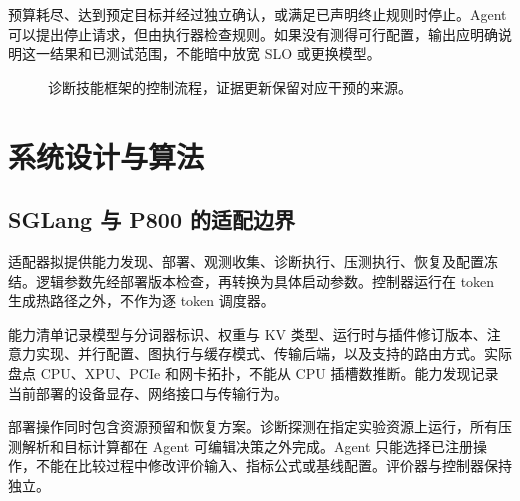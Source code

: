 \documentclass[preprint,12pt]{elsarticle}
\begin{document}
预算耗尽、达到预定目标并经过独立确认，或满足已声明终止规则时停止。Agent 可以提出停止请求，但由执行器检查规则。如果没有测得可行配置，输出应明确说明这一结果和已测试范围，不能暗中放宽 SLO 或更换模型。

\begin{figure}[t]
\centering
{}
\caption{诊断技能框架的控制流程，证据更新保留对应干预的来源。}
\label{fig:architecture}
\end{figure}

\section{系统设计与算法}
\subsection{SGLang 与 P800 的适配边界}
适配器拟提供能力发现、部署、观测收集、诊断执行、压测执行、恢复及配置冻结。逻辑参数先经部署版本检查，再转换为具体启动参数。控制器运行在 token 生成热路径之外，不作为逐 token 调度器。

能力清单记录模型与分词器标识、权重与 KV 类型、运行时与插件修订版本、注意力实现、并行配置、图执行与缓存模式、传输后端，以及支持的路由方式。实际盘点 CPU、XPU、PCIe 和网卡拓扑，不能从 CPU 插槽数推断。能力发现记录当前部署的设备显存、网络接口与传输行为。

部署操作同时包含资源预留和恢复方案。诊断探测在指定实验资源上运行，所有压测解析和目标计算都在 Agent 可编辑决策之外完成。Agent 只能选择已注册操作，不能在比较过程中修改评价输入、指标公式或基线配置。评价器与控制器保持独立。
\end{document}
